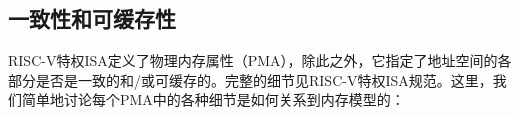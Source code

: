 \subsection{一致性和可缓存性}

RISC-V特权ISA定义了物理内存属性（PMA），除此之外，它指定了地址空间的各部分是否是一致的和/或可缓存的。完整的细节见RISC-V特权ISA规范。这里，我们简单地讨论每个PMA中的各种细节是如何关系到内存模型的：

